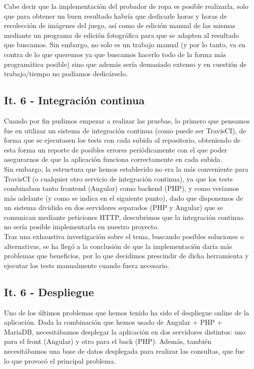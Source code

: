 Cabe decir que la implementación del probador de ropa es posible realizarla, solo que para obtener un buen resultado habría que dedicarle horas y horas de recolección de imágenes del juego, así como de edición manual de las mismas mediante un programa de edición fotográfica para que se adapten al resultado que buscamos. Sin embargo, no solo es un trabajo manual (y por lo tanto, va en contra de lo que queremos ya que buscamos hacerlo todo de la forma más programática posible) sino que además sería demasiado extenso y en cuestión de trabajo/tiempo no podíamos dedicárselo.

\subsection{It. 6 - Integración continua}

Cuando por fin pudimos empezar a realizar las pruebas, lo primero que pensamos fue en utilizar un sistema de integración continua (como puede ser TravisCI), de forma que se ejecutasen los tests con cada subida al repositorio, obteniendo de esta forma un reporte de posibles errores periódicamente con el que poder asegurarnos de que la aplicación funciona correctamente en cada subida.\\

Sin embargo, la estructura que hemos establecido no era la más conveniente para TravisCI (o cualquier otro servicio de integración continua), ya que los tests combinaban tanto frontend (Angular) como backend (PHP), y como veríamos más adelante (y como se indica en el siguiente punto), dado que disponemos de un sistema dividido en dos servidores separados (PHP y Angular) que se comunican mediante peticiones HTTP, descubrimos que la integración continua no sería posible implementarla en nuestro proyecto.\\

Tras una exhaustiva investigación sobre el tema, buscando posibles soluciones o alternativas, se ha llegó a la conclusión de que la implementación daría más problemas que beneficios, por lo que decidimos prescindir de dicha herramienta y ejecutar los tests manualmente cuando fuera necesario.\\


\subsection{It. 6 - Despliegue}

Uno de los últimos problemas que hemos tenido ha sido el despliegue online de la aplicación. Dada la combinación que hemos usado de Angular + PHP + MariaDB, necesitábamos desplegar la aplicación en dos servidores distintos: uno para el front (Angular) y otro para el back (PHP). Además, también necesitábamos una base de datos desplegada para realizar las consultas, que fue lo que provocó el principal problema.\\

